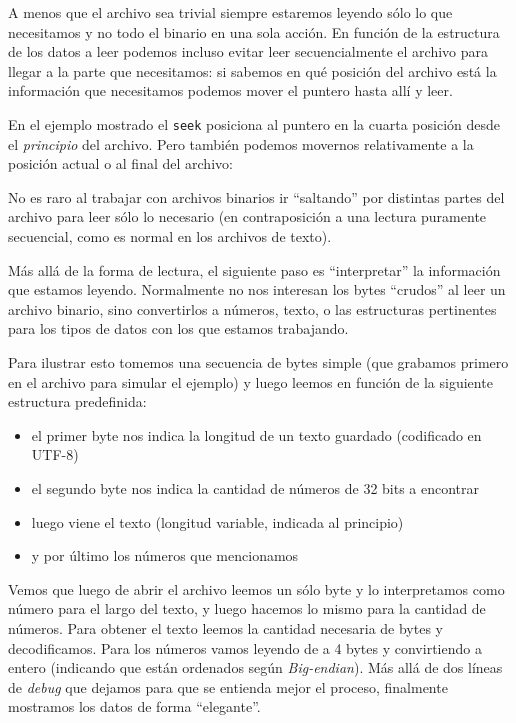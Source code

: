 
A menos que el archivo sea trivial siempre estaremos leyendo sólo lo que necesitamos y no todo el binario en una sola acción. En función de la estructura de los datos a leer podemos incluso evitar leer secuencialmente el archivo para llegar a la parte que necesitamos: si sabemos en qué posición del archivo está la información que necesitamos podemos mover el puntero hasta allí y leer.


En el ejemplo mostrado el \texttt{seek} posiciona al puntero en la cuarta posición desde el \textit{principio} del archivo. Pero también podemos movernos relativamente a la posición actual o al final del archivo:


No es raro al trabajar con archivos binarios ir ``saltando'' por distintas partes del archivo para leer sólo lo necesario (en contraposición a una lectura puramente secuencial, como es normal en los archivos de texto).

Más allá de la forma de lectura, el siguiente paso es ``interpretar'' la información que estamos leyendo. Normalmente no nos interesan los bytes ``crudos'' al leer un archivo binario, sino convertirlos a números, texto, o las estructuras pertinentes para los tipos de datos con los que estamos trabajando.

Para ilustrar esto tomemos una secuencia de bytes simple (que grabamos primero en el archivo para simular el ejemplo) y luego leemos en función de la siguiente estructura predefinida:

\begin{itemize}
    \item el primer byte nos indica la longitud de un texto guardado (codificado en UTF-8)
    \item el segundo byte nos indica la cantidad de números de 32 bits a encontrar
    \item luego viene el texto (longitud variable, indicada al principio)
    \item y por último los números que mencionamos
\end{itemize}


Vemos que luego de abrir el archivo leemos un sólo byte y lo interpretamos como número para el largo del texto, y luego hacemos lo mismo para la cantidad de números. Para obtener el texto leemos la cantidad necesaria de bytes y decodificamos. Para los números vamos leyendo de a 4 bytes y convirtiendo a entero (indicando que están ordenados según \textit{Big-endian}). Más allá de dos líneas de \textit{debug} que dejamos para que se entienda mejor el proceso, finalmente mostramos los datos de forma ``elegante''.

